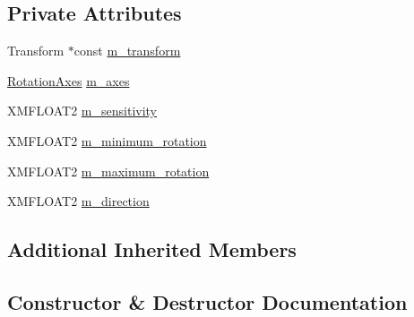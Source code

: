 \subsection*{Private Attributes}
\begin{DoxyCompactItemize}
\item 
Transform $\ast$const \hyperlink{classmage_1_1_mouse_look_script_ade6a6a3d786d64b67594d8ed38757e24}{m\+\_\+transform}
\item 
\hyperlink{namespacemage_a548e5c31b08a1078841ed21948f5bf4c}{Rotation\+Axes} \hyperlink{classmage_1_1_mouse_look_script_ab5df1b96d5860a9b8f30256e7c89b26b}{m\+\_\+axes}
\item 
X\+M\+F\+L\+O\+A\+T2 \hyperlink{classmage_1_1_mouse_look_script_a4f38b9bd8e7271503a70753ce6a923c7}{m\+\_\+sensitivity}
\item 
X\+M\+F\+L\+O\+A\+T2 \hyperlink{classmage_1_1_mouse_look_script_ad09bda241666f60dfc408500cafd073d}{m\+\_\+minimum\+\_\+rotation}
\item 
X\+M\+F\+L\+O\+A\+T2 \hyperlink{classmage_1_1_mouse_look_script_a0d5f2933555b76efd7cf83c7672574dd}{m\+\_\+maximum\+\_\+rotation}
\item 
X\+M\+F\+L\+O\+A\+T2 \hyperlink{classmage_1_1_mouse_look_script_a07c9a61869dab687a0426fa0c4b41fa7}{m\+\_\+direction}
\end{DoxyCompactItemize}
\subsection*{Additional Inherited Members}


\subsection{Constructor \& Destructor Documentation}
\hypertarget{classmage_1_1_mouse_look_script_a577529718cd5d5208976f5485de29ba1}{}\label{classmage_1_1_mouse_look_script_a577529718cd5d5208976f5485de29ba1} 

